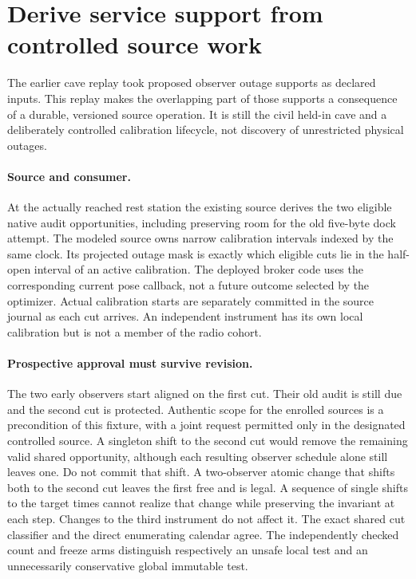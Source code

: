 \documentclass{article}
\begin{document}
\section*{Derive service support from controlled source work}
The earlier cave replay took proposed observer outage supports
as declared inputs. This replay makes the overlapping part of
those supports a consequence of a durable, versioned source
operation. It is still the civil held-in cave and a deliberately
controlled calibration lifecycle, not discovery of unrestricted
physical outages.

\paragraph{Source and consumer.}
At the actually reached rest station the existing source derives
the two eligible native audit opportunities, including preserving
room for the old five-byte dock attempt. The modeled source
owns narrow calibration intervals indexed by the same clock.
Its projected outage mask is exactly which eligible cuts lie
in the half-open interval of an active calibration. The deployed
broker code uses the corresponding current pose callback, not
a future outcome selected by the optimizer. Actual calibration
starts are separately committed in the source journal as each
cut arrives. An independent instrument has its own local
calibration but is not a member of the radio cohort.

\paragraph{Prospective approval must survive revision.}
The two early observers start aligned on the first cut. Their
old audit is still due and the second cut is protected.
Authentic scope for the enrolled sources is a precondition of
this fixture, with a joint request permitted only in the
designated controlled source. A singleton shift to the second
cut would remove the remaining valid shared opportunity,
although each resulting observer schedule alone still leaves
one. Do not commit that shift. A two-observer atomic change
that shifts both to the second cut leaves the first free and
is legal. A sequence of single shifts to the target times
cannot realize that change while preserving the invariant at
each step. Changes to the third instrument do not affect it.
The exact shared cut classifier and the direct enumerating
calendar agree. The independently checked count and freeze
arms distinguish respectively an unsafe local test and an
unnecessarily conservative global immutable test.
\end{document}
